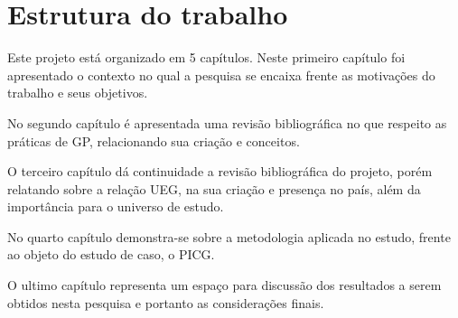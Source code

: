 \section{Estrutura do trabalho}

Este projeto está organizado em 5 capítulos. Neste primeiro capítulo foi apresentado o contexto no qual a pesquisa se encaixa frente as motivações do trabalho e seus objetivos.

No segundo capítulo é apresentada uma revisão bibliográfica no que respeito as práticas de GP, relacionando sua criação e conceitos.

O terceiro capítulo dá continuidade a revisão bibliográfica do projeto, porém relatando sobre a relação UEG, na sua criação e presença no país, além da importância para o universo de estudo.

No quarto capítulo demonstra-se sobre a metodologia aplicada no estudo, frente ao objeto do estudo de caso, o PICG.

O ultimo capítulo representa um espaço para discussão dos resultados a serem obtidos nesta pesquisa e portanto as considerações finais.

